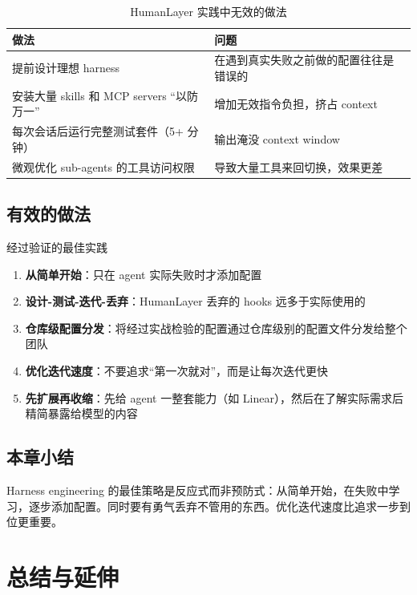 \documentclass[a4paper]{article}
\begin{document}
\begin{table}[H]
\centering
\caption{HumanLayer 实践中无效的做法}
\begin{tabular}{@{}p{5cm}p{8cm}@{}}
\toprule
\textbf{做法} & \textbf{问题} \\
\midrule
提前设计理想 harness & 在遇到真实失败之前做的配置往往是错误的 \\
安装大量 skills 和 MCP servers ``以防万一'' & 增加无效指令负担，挤占 context \\
每次会话后运行完整测试套件（5+ 分钟） & 输出淹没 context window \\
微观优化 sub-agents 的工具访问权限 & 导致大量工具来回切换，效果更差 \\
\bottomrule
\end{tabular}
\end{table}

\subsection{有效的做法}

\begin{importantbox}{经过验证的最佳实践}
\begin{enumerate}[leftmargin=1.5em]
    \item \textbf{从简单开始}：只在 agent 实际失败时才添加配置
    \item \textbf{设计-测试-迭代-丢弃}：HumanLayer 丢弃的 hooks 远多于实际使用的
    \item \textbf{仓库级配置分发}：将经过实战检验的配置通过仓库级别的配置文件分发给整个团队
    \item \textbf{优化迭代速度}：不要追求``第一次就对''，而是让每次迭代更快
    \item \textbf{先扩展再收缩}：先给 agent 一整套能力（如 Linear），然后在了解实际需求后精简暴露给模型的内容
\end{enumerate}
\end{importantbox}

\subsection{本章小结}

Harness engineering 的最佳策略是反应式而非预防式：从简单开始，在失败中学习，逐步添加配置。同时要有勇气丢弃不管用的东西。优化迭代速度比追求一步到位更重要。


\section{总结与延伸}
\end{document}
